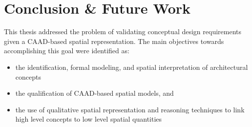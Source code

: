 \documentclass[12pt]{ucthesis}
\begin{document}





\chapter{Conclusion \& Future Work} \label{conclusion}
This thesis addressed the problem of validating conceptual design requirements given a CAAD-based spatial representation. The main objectives towards accomplishing this goal were identified as:
\begin{itemize}
\item the identification, formal modeling, and spatial interpretation of architectural concepts
\item the qualification of CAAD-based spatial models, and
\item the use of qualitative spatial representation and reasoning techniques to link high level concepts to low level spatial quantities
\end{itemize}
\end{document}
